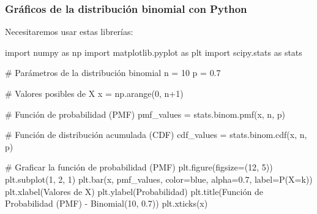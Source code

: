 \documentclass[
  letterpaper,
  DIV=11,
  numbers=noendperiod]{scrreprt}
\newenvironment{Shaded}{\begin{snugshade}}{\end{snugshade}}
\newcommand{\CommentTok}[1]{\textcolor[rgb]{0.37,0.37,0.37}{#1}}
\newcommand{\DecValTok}[1]{\textcolor[rgb]{0.68,0.00,0.00}{#1}}
\newcommand{\FloatTok}[1]{\textcolor[rgb]{0.68,0.00,0.00}{#1}}
\newcommand{\ImportTok}[1]{\textcolor[rgb]{0.00,0.46,0.62}{#1}}
\newcommand{\NormalTok}[1]{\textcolor[rgb]{0.00,0.23,0.31}{#1}}
\newcommand{\OperatorTok}[1]{\textcolor[rgb]{0.37,0.37,0.37}{#1}}
\newcommand{\StringTok}[1]{\textcolor[rgb]{0.13,0.47,0.30}{#1}}
\begin{document}
\subsubsection{Gráficos de la distribución binomial con
Python}\label{gruxe1ficos-de-la-distribuciuxf3n-binomial-con-python}

Necesitaremos usar estas librerías:

\begin{Shaded}
\begin{Highlighting}[]
\ImportTok{import}\NormalTok{ numpy }\ImportTok{as}\NormalTok{ np}
\ImportTok{import}\NormalTok{ matplotlib.pyplot }\ImportTok{as}\NormalTok{ plt}
\ImportTok{import}\NormalTok{ scipy.stats }\ImportTok{as}\NormalTok{ stats}
\end{Highlighting}
\end{Shaded}

\begin{Shaded}
\begin{Highlighting}[]
\CommentTok{\# Parámetros de la distribución binomial}
\NormalTok{n }\OperatorTok{=} \DecValTok{10}
\NormalTok{p }\OperatorTok{=} \FloatTok{0.7}

\CommentTok{\# Valores posibles de X}
\NormalTok{x }\OperatorTok{=}\NormalTok{ np.arange(}\DecValTok{0}\NormalTok{, n}\OperatorTok{+}\DecValTok{1}\NormalTok{)}

\CommentTok{\# Función de probabilidad (PMF)}
\NormalTok{pmf\_values }\OperatorTok{=}\NormalTok{ stats.binom.pmf(x, n, p)}

\CommentTok{\# Función de distribución acumulada (CDF)}
\NormalTok{cdf\_values }\OperatorTok{=}\NormalTok{ stats.binom.cdf(x, n, p)}

\CommentTok{\# Graficar la función de probabilidad (PMF)}
\NormalTok{plt.figure(figsize}\OperatorTok{=}\NormalTok{(}\DecValTok{12}\NormalTok{, }\DecValTok{5}\NormalTok{))}
\NormalTok{plt.subplot(}\DecValTok{1}\NormalTok{, }\DecValTok{2}\NormalTok{, }\DecValTok{1}\NormalTok{)}
\NormalTok{plt.bar(x, pmf\_values, color}\OperatorTok{=}\StringTok{\textquotesingle{}blue\textquotesingle{}}\NormalTok{, alpha}\OperatorTok{=}\FloatTok{0.7}\NormalTok{, label}\OperatorTok{=}\StringTok{\textquotesingle{}P(X=k)\textquotesingle{}}\NormalTok{)}
\NormalTok{plt.xlabel(}\StringTok{\textquotesingle{}Valores de X\textquotesingle{}}\NormalTok{)}
\NormalTok{plt.ylabel(}\StringTok{\textquotesingle{}Probabilidad\textquotesingle{}}\NormalTok{)}
\NormalTok{plt.title(}\StringTok{\textquotesingle{}Función de Probabilidad (PMF) {-} Binomial(10, 0.7)\textquotesingle{}}\NormalTok{)}
\NormalTok{plt.xticks(x)}
\end{Highlighting}
\end{Shaded}
\end{document}
